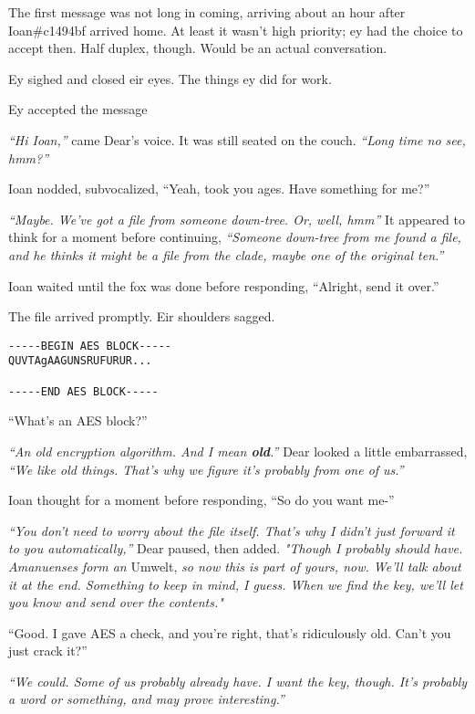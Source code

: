 The first message was not long in coming, arriving about an hour after Ioan\#c1494bf arrived home. At least it wasn't high priority; ey had the choice to accept then. Half duplex, though. Would be an actual conversation.

Ey sighed and closed eir eyes. The things ey did for work.

Ey accepted the message

\emph{``Hi Ioan,''} came Dear's voice. It was still seated on the couch. \emph{``Long time no see, hmm?''}

Ioan nodded, subvocalized, ``Yeah, took you ages. Have something for me?''

\emph{``Maybe. We've got a file from someone down-tree. Or, well, hmm''} It appeared to think for a moment before continuing, \emph{``Someone down-tree from me found a file, and he thinks it might be a file from the clade, maybe one of the original ten.''}

Ioan waited until the fox was done before responding, ``Alright, send it over.''

The file arrived promptly. Eir shoulders sagged.

\begin{verbatim}
-----BEGIN AES BLOCK-----
QUVTAgAAGUNSRUFURUR...

-----END AES BLOCK-----
\end{verbatim}

``What's an AES block?''

\emph{``An old encryption algorithm. And I mean \textbf{old}.''} Dear looked a little embarrassed, \emph{``We like old things. That's why we figure it's probably from one of us.''}

Ioan thought for a moment before responding, ``So do you want me-''

\emph{``You don't need to worry about the file itself. That's why I didn't just forward it to you automatically,''} Dear paused, then added. \emph{"Though I probably should have. Amanuenses form an} Umwelt, \emph{so now this is part of yours, now. We'll talk about it at the end. Something to keep in mind, I guess. When we find the key, we'll let you know and send over the contents."}

``Good. I gave AES a check, and you're right, that's ridiculously old. Can't you just crack it?''

\emph{``We could. Some of us probably already have. I want the key, though. It's probably a word or something, and may prove interesting.''}

